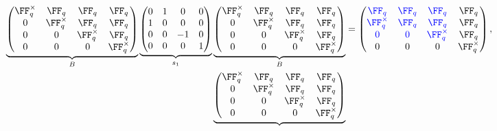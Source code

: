 \documentclass[11pt]{amsart}
\theoremstyle{remark}
\begin{document}
\begin{align*}
	\underbrace{\begin{pmatrix}
			\FF_q^\times & \FF_q        & \FF_q        & \FF_q        \\
			0            & \FF_q^\times & \FF_q        & \FF_q        \\
			0            & 0            & \FF_q^\times & \FF_q        \\
			0            & 0            & 0            & \FF_q^\times \\
		\end{pmatrix}}_{B}
	\underbrace{\begin{pmatrix}
			0 & 1 & 0  & 0 \\
			1 & 0 & 0  & 0 \\
			0 & 0 & -1 & 0 \\
			0 & 0 & 0  & 1
		\end{pmatrix}}_{s_1}
	\underbrace{\begin{pmatrix}
			\FF_q^\times & \FF_q        & \FF_q        & \FF_q        \\
			0            & \FF_q^\times & \FF_q        & \FF_q        \\
			0            & 0            & \FF_q^\times & \FF_q        \\
			0            & 0            & 0            & \FF_q^\times \\
		\end{pmatrix}}_{B} & =
	\begin{pmatrix}
		\color{blue}\FF_q        & \color{blue}\FF_q & \color{blue}\FF_q        & \FF_q        \\
		\color{blue}\FF_q^\times & \color{blue}\FF_q & \color{blue}\FF_q        & \FF_q        \\
		\color{blue}0            & \color{blue}0     & \color{blue}\FF_q^\times & \FF_q        \\
		0                        & 0                 & 0                        & \FF_q^\times
	\end{pmatrix},                     \\
	\underbrace{\begin{pmatrix}
			\FF_q^\times & \FF_q        & \FF_q        & \FF_q        \\
			0            & \FF_q^\times & \FF_q        & \FF_q        \\
			0            & 0            & \FF_q^\times & \FF_q        \\
			0            & 0            & 0            & \FF_q^\times \\

\end{pmatrix}}
\end{align*}
\end{document}
